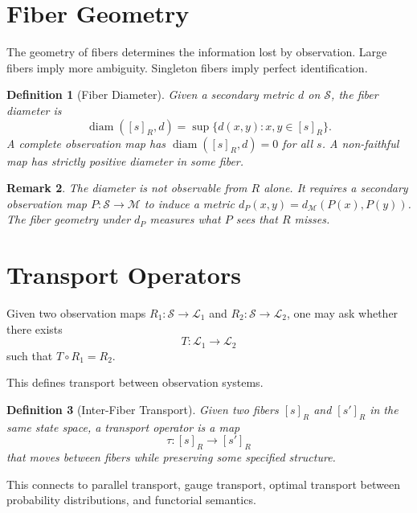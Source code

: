 \documentclass[11pt]{amsart}
\newtheorem{definition}{Definition}[section]
\newtheorem{remark}[definition]{Remark}
\begin{document}
\section{Fiber Geometry}

The geometry of fibers determines the information lost by observation.
Large fibers imply more ambiguity.
Singleton fibers imply perfect identification.

\begin{definition}[Fiber Diameter]
Given a secondary metric $d$ on $\mathcal{S}$, the fiber diameter is
\[
\operatorname{diam}([s]_R, d)
=
\sup \{ d(x, y) : x, y \in [s]_R \}.
\]
A complete observation map has $\operatorname{diam}([s]_R, d) = 0$ for
all $s$. A non-faithful map has strictly positive diameter in some fiber.
\end{definition}

\begin{remark}
The diameter is not observable from $R$ alone. It requires a secondary
observation map $P: \mathcal{S} \rightarrow \mathcal{M}$ to induce a metric
$d_P(x, y) = d_{\mathcal{M}}(P(x), P(y))$. The fiber geometry under
$d_P$ measures what $P$ sees that $R$ misses.
\end{remark}

\section{Transport Operators}

Given two observation maps $R_1: \mathcal{S} \to \mathcal{L}_1$ and
$R_2: \mathcal{S} \to \mathcal{L}_2$, one may ask whether there exists
\[
T: \mathcal{L}_1 \rightarrow \mathcal{L}_2
\]
such that $T \circ R_1 = R_2$.

This defines transport between observation systems.

\begin{definition}[Inter-Fiber Transport]
Given two fibers $[s]_R$ and $[s']_R$ in the same state space, a transport
operator is a map
\[
\tau: [s]_R \longrightarrow [s']_R
\]
that moves between fibers while preserving some specified structure.
\end{definition}

This connects to parallel transport, gauge transport, optimal transport
between probability distributions, and functorial semantics.

\end{document}

